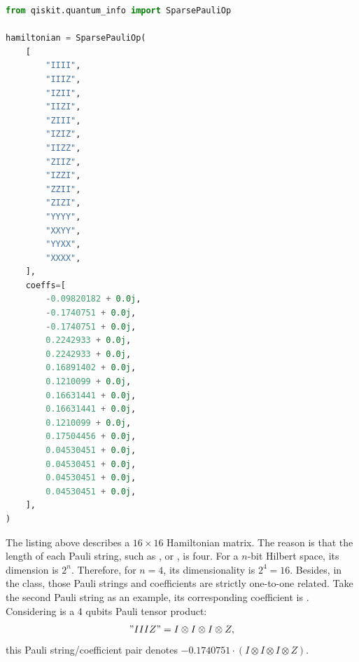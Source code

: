  \begin{lstlisting}[language=Python, caption=Constructing an Operator for VQE, frame=single, label={lst:Constructing Operator}]
from qiskit.quantum_info import SparsePauliOp
 
hamiltonian = SparsePauliOp(
    [
        "IIII",
        "IIIZ",
        "IZII",
        "IIZI",
        "ZIII",
        "IZIZ",
        "IIZZ",
        "ZIIZ",
        "IZZI",
        "ZZII",
        "ZIZI",
        "YYYY",
        "XXYY",
        "YYXX",
        "XXXX",
    ],
    coeffs=[
        -0.09820182 + 0.0j,
        -0.1740751 + 0.0j,
        -0.1740751 + 0.0j,
        0.2242933 + 0.0j,
        0.2242933 + 0.0j,
        0.16891402 + 0.0j,
        0.1210099 + 0.0j,
        0.16631441 + 0.0j,
        0.16631441 + 0.0j,
        0.1210099 + 0.0j,
        0.17504456 + 0.0j,
        0.04530451 + 0.0j,
        0.04530451 + 0.0j,
        0.04530451 + 0.0j,
        0.04530451 + 0.0j,
    ],
)
\end{lstlisting}
The listing above describes a $16\times16$ Hamiltonian matrix. The reason is that the length of each Pauli string, such as , or , is four. For a $n$-bit Hilbert space, its dimension is $2^n$. Therefore, for $n=4$, its dimensionality is $2^4=16$. Besides, in the  class, those Pauli strings and coefficients are strictly one-to-one related. Take the second Pauli string  as an example, its corresponding coefficient is . Considering  is a 4 qubits Pauli tensor product:
\[
"IIIZ"=I\otimes I\otimes I\otimes Z,
\]
this Pauli string/coefficient pair denotes $-0.1740751\cdot(I\otimes I\otimes I\otimes Z)$.

